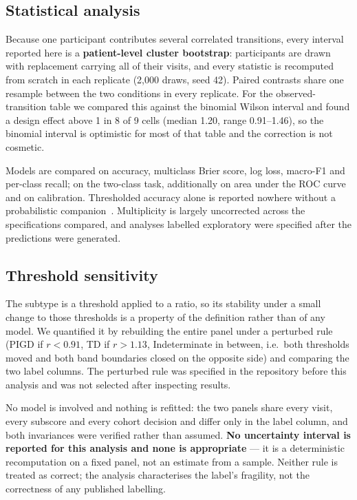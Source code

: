 \documentclass[journal]{IEEEtran}
\begin{document}
\subsection{Statistical analysis}
Because one participant contributes several correlated transitions, every
interval reported here is a \textbf{patient-level cluster bootstrap}:
participants are drawn with replacement carrying all of their visits, and every
statistic is recomputed from scratch in each replicate (2,000 draws, seed 42).
Paired contrasts share one resample between the two conditions in every
replicate. For the observed-transition table we compared this against the
binomial Wilson interval and found a design effect above 1 in 8 of 9 cells
(median 1.20, range 0.91--1.46), so the binomial interval is optimistic for most
of that table and the correction is not cosmetic.

Models are compared on accuracy, multiclass Brier score, log loss, macro-F1 and
per-class recall; on the two-class task, additionally on area under the ROC
curve and on calibration. Thresholded accuracy alone is reported nowhere without
a probabilistic companion~\cite{gneiting2007,vancalster2019}. Multiplicity is
largely uncorrected across the specifications compared, and analyses labelled
exploratory were specified after the predictions were generated.

\subsection{Threshold sensitivity}
\label{sec:threshold}
The subtype is a threshold applied to a ratio, so its stability under a small
change to those thresholds is a property of the definition rather than of any
model. We quantified it by rebuilding the entire panel under a perturbed rule
(PIGD if $r<0.91$, TD if $r>1.13$, Indeterminate in between, i.e.\ both
thresholds moved and both band boundaries closed on the opposite side) and
comparing the two label columns. The perturbed rule was specified in the
repository before this analysis and was not selected after inspecting results.

No model is involved and nothing is refitted: the two panels share every visit,
every subscore and every cohort decision and differ only in the label column,
and both invariances were verified rather than assumed. \textbf{No uncertainty
interval is reported for this analysis and none is appropriate} --- it is a
deterministic recomputation on a fixed panel, not an estimate from a sample.
Neither rule is treated as correct; the analysis characterises the label's
fragility, not the correctness of any published labelling.
\end{document}
